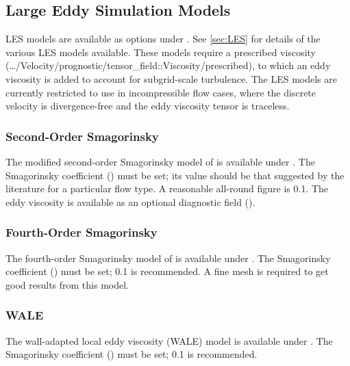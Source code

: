 \subsection{Large Eddy Simulation Models}

LES models are available as options under . See \ref{sec:LES} for details of the various LES models available. These models require a prescribed viscosity (\ldots/Velocity/prognostic/tensor\_field::Viscosity/prescribed), to which an eddy viscosity is added to account for subgrid-scale turbulence. The LES models are currently restricted to use in incompressible flow cases, where the discrete velocity is divergence-free and the eddy viscosity tensor is traceless.

\subsubsection{Second-Order Smagorinsky}

The modified second-order Smagorinsky model of \citet{bentham2003} is available under . The Smagorinsky coefficient () must be set; its value should be that suggested by the literature for a particular flow type. A reasonable all-round figure is 0.1. The eddy viscosity is available as an optional diagnostic field ().

\subsubsection{Fourth-Order Smagorinsky}

The fourth-order Smagorinsky model of \citet{bentham2003} is available under . The Smagorinsky coefficient () must be set; 0.1 is recommended. A fine mesh is required to get good results from this model.

\subsubsection{WALE}

The wall-adapted local eddy viscosity (WALE) model is available under . The Smagorinsky coefficient () must be set; 0.1 is recommended.

